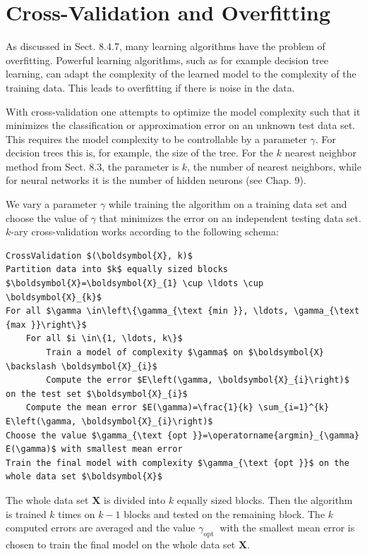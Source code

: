 \documentclass[10pt]{book}
\begin{document}
\section{Cross-Validation and Overfitting}
As discussed in Sect. 8.4.7, many learning algorithms have the problem of overfitting. Powerful learning algorithms, such as for example decision tree learning, can adapt the complexity of the learned model to the complexity of the training data. This leads to overfitting if there is noise in the data.

With cross-validation one attempts to optimize the model complexity such that it minimizes the classification or approximation error on an unknown test data set. This requires the model complexity to be controllable by a parameter $\gamma$. For decision trees this is, for example, the size of the tree. For the $k$ nearest neighbor method from Sect. 8.3, the parameter is $k$, the number of nearest neighbors, while for neural networks it is the number of hidden neurons (see Chap. 9).

We vary a parameter $\gamma$ while training the algorithm on a training data set and choose the value of $\gamma$ that minimizes the error on an independent testing data set. $k$-ary cross-validation works according to the following schema:

\begin{verbatim}
CrossValidation $(\boldsymbol{X}, k)$
Partition data into $k$ equally sized blocks $\boldsymbol{X}=\boldsymbol{X}_{1} \cup \ldots \cup \boldsymbol{X}_{k}$
For all $\gamma \in\left\{\gamma_{\text {min }}, \ldots, \gamma_{\text {max }}\right\}$
    For all $i \in\{1, \ldots, k\}$
        Train a model of complexity $\gamma$ on $\boldsymbol{X} \backslash \boldsymbol{X}_{i}$
        Compute the error $E\left(\gamma, \boldsymbol{X}_{i}\right)$ on the test set $\boldsymbol{X}_{i}$
    Compute the mean error $E(\gamma)=\frac{1}{k} \sum_{i=1}^{k} E\left(\gamma, \boldsymbol{X}_{i}\right)$
Choose the value $\gamma_{\text {opt }}=\operatorname{argmin}_{\gamma} E(\gamma)$ with smallest mean error
Train the final model with complexity $\gamma_{\text {opt }}$ on the whole data set $\boldsymbol{X}$
\end{verbatim}

The whole data set $\boldsymbol{X}$ is divided into $k$ equally sized blocks. Then the algorithm is trained $k$ times on $k-1$ blocks and tested on the remaining block. The $k$ computed errors are averaged and the value $\gamma_{\text {opt }}$ with the smallest mean error is chosen to train the final model on the whole data set $\boldsymbol{X}$.
\end{document}
